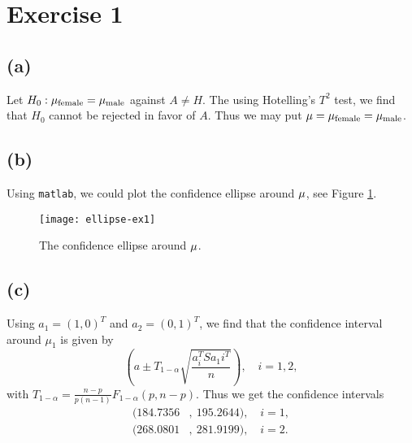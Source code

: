 \section*{Exercise 1}

\subsection*{(a)}
\label{sec:a}

Let $H_0: \mu_{\rm female}= \mu_{\rm male}$ against $A \neq H$. The
using Hotelling's $T^2$ test, we find that $H_0$ cannot be rejected in
favor of $A$. Thus we may put $\mu = \mu_{\rm female} = \mu_{\rm male}$.

\subsection*{(b)}
\label{sec:b}

Using \texttt{matlab}, we could plot the confidence ellipse around
${\bf \mu}$, see Figure \ref{fig:ex1-ellipse}.
\begin{figure}[h]
  \centering
  \texttt{[image: ellipse-ex1]}
  \caption{The confidence ellipse around ${\bf \mu}$.}
  \label{fig:ex1-ellipse}
\end{figure}

\subsection*{(c)}
\label{sec:c}

Using $a_1 = (1,0)^T$ and $a_2 = (0,1)^T$, we find that the confidence
interval around $\mu_1$ is given by
\begin{equation*}
  \left(
    a \pm T_{1-\alpha} \sqrt{\frac{a_i^T S a_1i^T}{n}}
  \right), \quad i = 1,2,
\end{equation*}
with $T_{1-\alpha} = \frac{n-p}{p(n-1)}F_{1-\alpha}(p, n-p)$. Thus we
get the confidence intervals
\begin{align*}
  (184.7356&,\ 195.2644),\quad i = 1, \\
  (268.0801&,\ 281.9199),\quad i = 2.
\end{align*}


